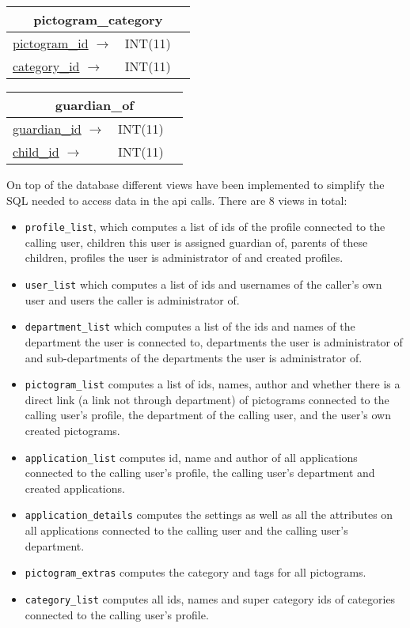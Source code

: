 \vspace{10pt}

\begin{tabular}{|l|l|c|}
\hline
\multicolumn{3}{|c|}{pictogram\_category} \\
\hline
\underline{pictogram\_id} $ \rightarrow $ & INT(11) & \\
\underline{category\_id} $ \rightarrow $ & INT(11) & \\
\hline
\end{tabular}

\vspace{10pt}

\begin{tabular}{|l|l|c|}
\hline
\multicolumn{3}{|c|}{guardian\_of} \\
\hline
\underline{guardian\_id} $ \rightarrow $ & INT(11) & \\
\underline{child\_id} $ \rightarrow $ & INT(11) & \\
\hline
\end{tabular}

\vspace{10pt}

On top of the database different views have been implemented to simplify the SQL needed to access data in the \ac{api} calls. 
There are 8 views in total:
\begin{itemize}
\item \lstinline|profile_list|, which computes a list of ids of the profile connected to the calling user, children this user is assigned guardian of, parents of these children, profiles the user is administrator of and created profiles. 
\item \lstinline|user_list| which computes a list of ids and usernames of the caller's own user and users the caller is administrator of.
\item \lstinline|department_list| which computes a list of the ids and names of the department the user is connected to, departments the user is administrator of and sub-departments of the departments the user is administrator of.
\item \lstinline|pictogram_list| computes a list of ids, names, author and whether there is a direct link (a link not through department) of pictograms connected to the calling user's profile, the department of the calling user, and the user's own created pictograms.
\item \lstinline|application_list| computes id, name and author of all applications connected to the calling user's profile, the calling user's department and created applications.
\item \lstinline|application_details| computes the settings as well as all the attributes on all applications connected to the calling user and the calling user's department.
\item \lstinline|pictogram_extras| computes the category and tags for all pictograms.
\item \lstinline|category_list| computes all ids, names and super category ids of categories connected to the calling user's profile.
\end{itemize}

